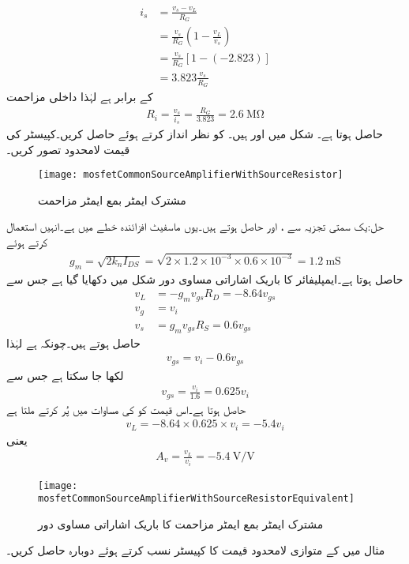 \begin{align*}
i_s &=\frac{v_s-v_L}{R_G}\\
&=\frac{v_s}{R_G} \left(1-\frac{v_L}{v_s} \right)\\
&=\frac{v_s}{R_G} \left[1-(-2.823) \right]\\
&=3.823 \frac{v_s}{R_G}
\end{align*}
کے برابر ہے لہٰذا داخلی مزاحمت
\begin{align*}
R_i=\frac{v_s}{i_s}=\frac{R_G}{3.823}=\SI{2.6}{\mega \ohm}
\end{align*}
حاصل ہوتا ہے۔
شکل  میں  اور  ہیں۔ کو نظر انداز کرتے ہوئے  حاصل کریں۔کپیسٹر کی قیمت لامحدود تصور کریں۔
\begin{figure}
\centering
\texttt{[image: mosfetCommonSourceAmplifierWithSourceResistor]}
\caption{مشترک ایمٹر بمع ایمٹر مزاحمت}
\label{شکل_ماسفیٹ_مخارج_مزاحمت_کے_ساتھ}
\end{figure}

حل:یک سمتی تجزیہ سے ،  اور  حاصل ہوتے ہیں۔یوں ماسفیٹ افزائندہ خطے میں ہے۔انہیں استعمال کرتے ہوئے
\begin{align*}
g_m=\sqrt{2 k_n I_{DS}}=\sqrt{2 \times 1.2 \times 10^{-3} \times 0.6 \times 10^{-3}}=\SI{1.2}{\milli \siemens}
\end{align*}
حاصل ہوتا ہے۔ایمپلیفائر کا باریک اشاراتی مساوی دور شکل  میں دکھایا گیا ہے جس سے
\begin{align*}
v_L&=-g_m v_{gs} R_D=-8.64 v_{gs}\\
v_g&=v_i\\
v_s&=g_m v_{gs} R_S=0.6 v_{gs}
\end{align*}
حاصل ہوتے ہیں۔چونکہ  ہے لہٰذا
\begin{align*}
v_{gs}=v_i-0.6v_{gs}
\end{align*}
لکھا جا سکتا ہے جس سے
\begin{align*}
v_{gs}=\frac{v_i}{1.6}=0.625 v_{i}
\end{align*}
حاصل ہوتا ہے۔اس قیمت کو  کی مساوات میں پُر کرتے ملتا ہے 
\begin{align*}
v_L=-8.64 \times 0.625 \times v_i=-5.4 v_i
\end{align*}
یعنی
\begin{align*}
A_v=\frac{v_L}{v_i}=\SI{-5.4}{\volt \per \volt}
\end{align*}
%
\begin{figure}
\centering
\texttt{[image: mosfetCommonSourceAmplifierWithSourceResistorEquivalent]}
\caption{مشترک ایمٹر بمع ایمٹر مزاحمت کا باریک اشاراتی مساوی دور}
\label{شکل_ماسفیٹ_مخارج_مزاحمت_کے_ساتھ_مساوی}
\end{figure}
مثال  میں  کے متوازی لامحدود قیمت کا کپیسٹر نسب کرتے ہوئے  دوبارہ حاصل کریں۔

